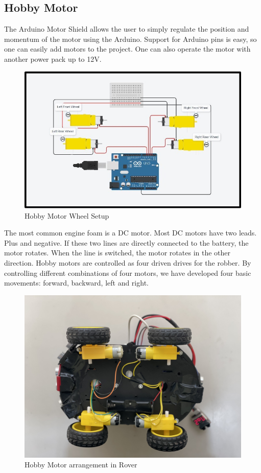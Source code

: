 \documentclass[conference,a4paper]{IEEEtran}
\begin{document}
\subsection{Hobby Motor}
The Arduino Motor Shield allows the user to simply regulate the position and momentum of the motor using the Arduino. Support for Arduino pins is easy, so one can easily add motors to the project. One can also operate the motor with another power pack up to 12V.
\begin{figure}[ht]
\centering
\includegraphics[width=1\linewidth]{Hobby.jpg}
\caption{Hobby Motor Wheel Setup}
\label{Fig: Hobby}
\end{figure}
The most common engine foam is a DC motor. Most DC motors have  two leads. Plus and negative. If these two lines are directly connected to the battery, the motor rotates. When the line is switched, the motor rotates in the other direction.  
Hobby motors are controlled as four driven drives for the robber. By controlling different combinations of  four motors, we have developed four basic movements: forward, backward, left and right.
\begin{figure}[ht]
\centering
\includegraphics[width=1\linewidth]{Roverbottom.jpg}
\caption{Hobby Motor arrangement in Rover}
\label{Fig: Hobby Arrangement}
\end{figure}
\end{document}
